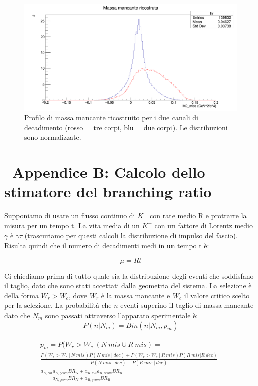 \documentclass[8pt]{extarticle}
\begin{document}
\clearpage

\begin{figure}[!h]
\begin{center}
\includegraphics[scale=0.25]{reco_miss_norm}
\caption{Profilo di massa mancante ricostruito per i due canali di decadimento (rosso = tre corpi, blu = due corpi). Le distribuzioni
sono normalizzate.}
\label{fig:reco_miss_norm}
\end{center}
\end{figure}

\section{\ Appendice B: Calcolo dello stimatore del branching ratio} \label{sec:calcoli}
\justify

Supponiamo di usare un flusso continuo di $K^+$ con rate medio R e protrarre la misura per un tempo t. La vita media di un $K^+$ con un fattore di Lorentz medio $\gamma$ è $\gamma \tau$ (trascuriamo per questi calcoli la distribuzione di impulso del fascio). Risulta quindi che il numero di decadimenti medi in un tempo t è: 

$$
\mu = Rt
$$

Ci chiediamo prima di tutto quale sia la distribuzione degli eventi che soddisfano il taglio, dato che sono stati accettati dalla geometria del sistema. La selezione è della forma $W_r > W_c$, dove $W_r$ è la massa mancante e $W_c$ il valore critico scelto per la selezione. La probabilità che $n$ eventi superino il taglio di massa mancante dato che $N_m$ sono passati attraverso l'apparato sperimentale è:
$$
P(n | N_m) = Bin(n | N_m, p_m)
$$

\begin{align*}
\begin{split}
& p_m = P(W_r > W_c | (N\ mis \cup R\ mis) = \\
& \frac{P(W_r > W_c\ |\ N\ mis)P(N\ mis\ |\ dec) + P(W_r > W_c\ |\ R\ mis)P(R\ mis | R\ dec)}{P(N\ mis\ |\ dec) + P(R\ mis\ |\ dec)} = \\
& \frac{a_{N, cut}a_{N, geom}BR_N + a_{R, cut}a_{R, geom}BR_R}{a_{N, geom}BR_N + a_{R, geom}BR_R} \\
\end{split}
\end{align*}
\end{document}
